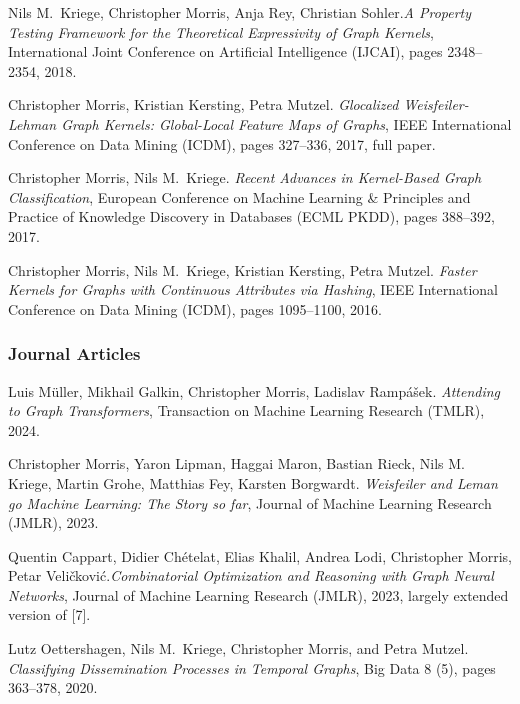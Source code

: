 \documentclass[11pt, a4paper, DIV=14, headings=small]{scrartcl}
\begin{document}
\begin{thebibliography}{15}
		Nils M.~Kriege, Christopher Morris, Anja Rey, Christian Sohler.\footnotemark[2]
		\emph{A Property Testing Framework for the Theoretical Expressivity of Graph Kernels},
		International Joint Conference on Artificial Intelligence (IJCAI), pages 2348--2354, 2018.
		
		Christopher Morris, Kristian Kersting, Petra Mutzel.
		\emph{Glocalized Weisfeiler-Lehman Graph Kernels: Global-Local Feature Maps of Graphs},
		IEEE International Conference on Data Mining (ICDM), pages 327--336, 2017, full paper.
		
		Christopher Morris, Nils M.~Kriege.
		\emph{Recent Advances in Kernel-Based Graph Classification},
		European Conference on Machine Learning \& Principles and Practice of Knowledge Discovery in Databases (ECML PKDD), pages 388--392, 2017.
		
		Christopher Morris, Nils M.~Kriege, Kristian Kersting, Petra Mutzel.
		\emph{Faster Kernels for Graphs with Continuous Attributes via Hashing},
		IEEE International Conference on Data Mining (ICDM), pages 1095--1100, 2016.
		
		\subsubsection*{Journal Articles}
		
		Luis Müller, Mikhail Galkin, Christopher Morris, Ladislav Rampášek.
		\emph{Attending to Graph Transformers}, Transaction on Machine Learning Research (TMLR), 2024.		
		
		Christopher Morris, Yaron Lipman, Haggai Maron, Bastian Rieck, Nils M. Kriege, Martin Grohe, Matthias Fey, Karsten Borgwardt.
		\emph{Weisfeiler and Leman go Machine Learning: The Story so far}, Journal of Machine Learning Research (JMLR), 2023.
		
		Quentin Cappart, Didier Chételat, Elias Khalil, Andrea Lodi, Christopher Morris, Petar Veli\v{c}kovi\'{c}.\footnotemark[2]
		\emph{Combinatorial Optimization and Reasoning with Graph Neural Networks},
		Journal of Machine Learning Research (JMLR), 2023, largely extended version of [7].
		
		Lutz Oettershagen, Nils M.~Kriege, Christopher Morris, and Petra Mutzel.
		\emph{Classifying Dissemination Processes in Temporal Graphs},
		Big Data 8 (5), pages 363--378, 2020.
		

\end{thebibliography}
\end{document}
